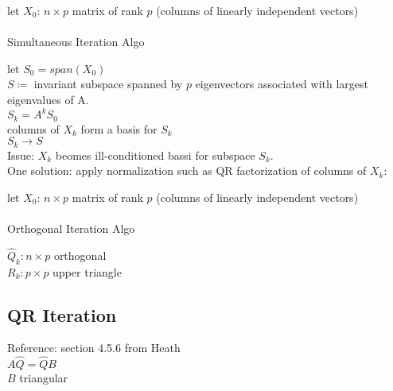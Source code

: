 \documentclass[8pt,letter]{article}
\begin{document}
\begin{multicols*}{2}
    \begin{algorithm}[H]
      let $X_0$: $n \times p$ matrix of rank $p$ (columns of linearly independent vectors)\\
      \\
      \caption{Simultaneous Iteration Algo \label{Algo_simultaneous_iteration}}
    \end{algorithm}    

    let $S_0 = span(X_0)$\\
    $S \coloneqq$ invariant subspace spanned by $p$ eigenvectors associated with largest eigenvalues of A.\\
    $S_k = A^k S_0$\\
    columns of $X_k$ form a basis for $S_k$\\
    $S_k \rightarrow S$\\

    Issue: $X_k$ beomes ill-conditioned bassi for subspace $S_k$.\\
    One solution: apply normalization such as QR factorization of columns of $X_k$:
    
    \begin{algorithm}[H]
      let $X_0$: $n \times p$ matrix of rank $p$ (columns of linearly independent vectors)\\
      \\
      \caption{Orthogonal Iteration Algo \label{Algo_orthogonal_iteration}}
    \end{algorithm}

    $\hat{Q}_k:  n \times p$ orthogonal\\
    $R_k:  p \times p$ upper triangle\\

    \vfill\null
    \pagebreak
    
    \subsection{QR Iteration}
    Reference: section 4.5.6 from Heath\\
    
    $A\hat{Q} = \hat{Q}B$\\
    $B$ triangular\\


\end{multicols*}
\end{document}
